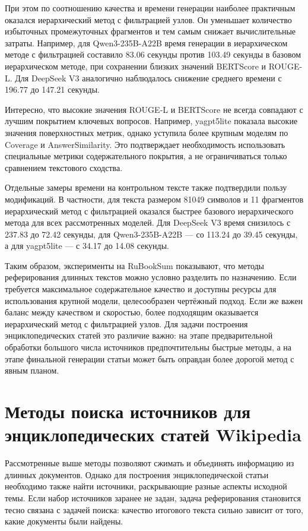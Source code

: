 \documentclass[oneside,senior,etd]{BYUPhys}
\begin{document}
При этом по соотношению качества и времени генерации наиболее практичным оказался иерархический метод с фильтрацией узлов. 
Он уменьшает количество избыточных промежуточных фрагментов и тем самым снижает вычислительные затраты. 
Например, для Qwen3-235B-A22B время генерации в иерархическом методе с фильтрацией составило 83.06 секунды против 103.49 секунды в базовом иерархическом методе, 
при сохранении близких значений BERTScore и ROUGE-L. Для DeepSeek V3 аналогично наблюдалось снижение среднего времени с 196.77 до 147.21 секунды.

Интересно, что высокие значения ROUGE-L и BERTScore не всегда совпадают с лучшим покрытием ключевых вопросов. Например, yagpt5lite показала высокие значения поверхностных метрик, однако уступила более крупным моделям по Coverage и AnswerSimilarity. Это подтверждает необходимость использовать специальные метрики содержательного покрытия, а не ограничиваться только сравнением текстового сходства.

Отдельные замеры времени на контрольном тексте также подтвердили пользу модификаций. В частности, для текста размером 81049 символов и 11 фрагментов иерархический метод с фильтрацией оказался быстрее базового иерархического метода для всех рассмотренных моделей. Для DeepSeek V3 время снизилось с 237.83 до 72.42 секунды, для Qwen3-235B-A22B --- со 113.24 до 39.45 секунды, а для yagpt5lite --- с 34.17 до 14.08 секунды.

Таким образом, эксперименты на RuBookSum показывают, что методы реферирования длинных текстов можно условно разделить по назначению. Если требуется максимальное содержательное качество и доступны ресурсы для использования крупной модели, целесообразен чертёжный подход. Если же важен баланс между качеством и скоростью, более подходящим оказывается иерархический метод с фильтрацией узлов. Для задачи построения энциклопедических статей это различие важно: на этапе предварительной обработки большого числа источников предпочтительны быстрые методы, а на этапе финальной генерации статьи может быть оправдан более дорогой метод с явным планом.

\section{Методы поиска источников для энциклопедических статей Wikipedia}

Рассмотренные выше методы позволяют сжимать и объединять информацию из длинных документов. 
Однако для построения энциклопедической статьи необходимо также найти источники, раскрывающие разные аспекты исходной темы. 
Если набор источников заранее не задан, задача реферирования становится тесно связана с задачей поиска: 
качество итогового текста сильно зависит от того, какие документы были найдены.
\end{document}
